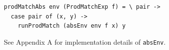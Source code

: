 \documentclass[runningheads, a4paper]{llncs}
\newcommand{\ttt}{\texttt}
\newenvironment{todont}
               {\comment}
               {\endcomment}
\begin{document}
\begin{lstlisting}
prodMatchAbs env (ProdMatchExp f) = \ pair ->
  case pair of (x, y) ->
    runProdMatch (absEnv env f x) y
\end{lstlisting}

See Appendix A for implementation details of \ttt{absEnv}.














\end{document}

